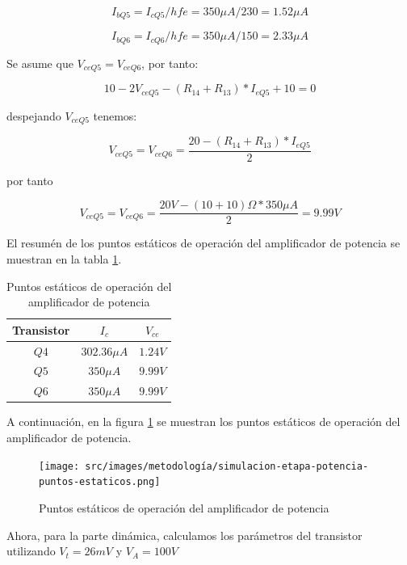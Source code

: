 $$I_{bQ5} = I_{cQ5} / hfe = 350\mu A / 230 = 1.52 \mu A $$

$$I_{bQ6} = I_{cQ6} / hfe = 350\mu A / 150 = 2.33 \mu A $$

Se asume que $V_{ceQ5} = V_{ceQ6} $, por tanto:

$$ 10 - 2 V_{ceQ5} - (R_{14} + R_{13}) * I_{eQ5} + 10 = 0$$

despejando $V_{ceQ5}$ tenemos:

\begin{equation}
    V_{ceQ5} = V_{ceQ6} = \frac{ 20 - (R_{14} + R_{13}) * I_{eQ5} }{2}
\end{equation}

por tanto 

$$ V_{ceQ5} = V_{ceQ6} = \frac{ 20 V - (10 + 10) \Omega * 350\mu A }{2} = 9.99 V$$

El resumén de los puntos estáticos de operación del amplificador de potencia se muestran en la tabla \ref{tab:amplificador-de-potencia-puntos-estaticos}.

\begin{table}[ht]
    \centering
    \begin{tabular}{|c|c|c|}
        \hline
        Transistor & \textbf{$I_c$} & \textbf{$V_{ce}$} \\
        \hline
        $Q4$ & $302.36 \mu A$ & $1.24 V$ \\
        $Q5$ & $350\mu A$ & $9.99 V$ \\
        $Q6$ & $350\mu A$ & $9.99 V$ \\
        \hline
    \end{tabular}
    \caption{Puntos estáticos de operación del amplificador de potencia}
    \label{tab:amplificador-de-potencia-puntos-estaticos}
\end{table}

A continuación, en la figura \ref{fig:met-puntos-estaticos-amplificador-de-potencia} se muestran los puntos estáticos de operación del amplificador de potencia.

\begin{figure}[ht]
    \centering
    \texttt{[image: src/images/metodología/simulacion-etapa-potencia-puntos-estaticos.png]}
    \caption{Puntos estáticos de operación del amplificador de potencia}
    \label{fig:met-puntos-estaticos-amplificador-de-potencia}
\end{figure}

Ahora, para la parte dinámica, calculamos los parámetros del transistor utilizando $V_t = 26 mV$ y $V_A = 100 V$

